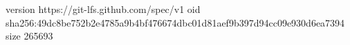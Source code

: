 version https://git-lfs.github.com/spec/v1
oid sha256:49dc8be752b2e4785a9b4bf476674dbc01d81aef9b397d94cc09e930d6ea7394
size 265693
